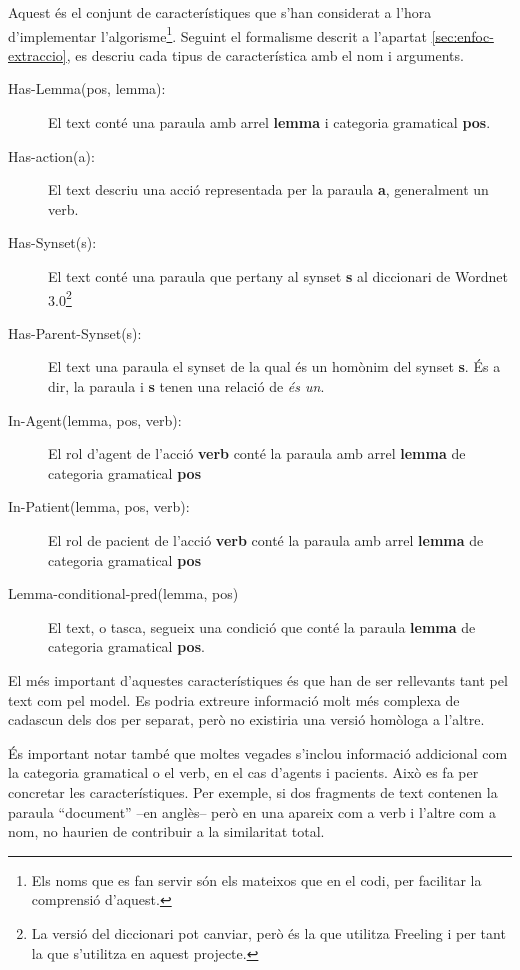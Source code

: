 Aquest és el conjunt de característiques que s'han considerat a l'hora d'implementar l'algorisme\footnote{Els noms que es fan servir són els mateixos que en el codi, per facilitar la comprensió d'aquest.}. Seguint el formalisme descrit a l'apartat \ref{sec:enfoc-extraccio}, es descriu cada tipus de característica amb el nom i arguments.

\begin{description}
    \item[Has-Lemma(pos, lemma): ]{El text conté una paraula amb arrel \textbf{lemma} i categoria gramatical \textbf{pos}.}
    \item[Has-action(a):]{El text descriu una acció representada per la paraula \textbf{a}, generalment un verb.}
    \item[Has-Synset(s):]{El text conté una paraula que pertany al synset \textbf{s} al diccionari de Wordnet 3.0\footnote{La versió del diccionari pot canviar, però és la que utilitza Freeling i per tant la que s'utilitza en aquest projecte.}}
    \item[Has-Parent-Synset(s):]{El text una paraula el synset de la qual és un homònim del synset \textbf{s}. És a dir, la paraula i \textbf{s} tenen una relació de \emph{és un}.}
    \item[In-Agent(lemma, pos, verb):]{El rol d'agent de l'acció \textbf{verb} conté la paraula amb arrel \textbf{lemma} de categoria gramatical \textbf{pos}}
    \item[In-Patient(lemma, pos, verb):]{El rol de pacient de l'acció \textbf{verb} conté la paraula amb arrel \textbf{lemma} de categoria gramatical \textbf{pos}}
    \item[Lemma-conditional-pred(lemma, pos)]{El text, o tasca, segueix una condició que conté la paraula \textbf{lemma} de categoria gramatical \textbf{pos}.}
\end{description}

El més important d'aquestes característiques és que han de ser rellevants tant pel text com pel model. Es podria extreure informació molt més complexa de cadascun dels dos per separat, però no existiria una versió homòloga a l'altre. 

És important notar també que moltes vegades s'inclou informació addicional com la categoria gramatical o el verb, en el cas d'agents i pacients. Això es fa per concretar les característiques. Per exemple, si dos fragments de text contenen la paraula ``document'' --en anglès-- però en una apareix com a verb i l'altre com a nom, no haurien de contribuir a la similaritat total.

